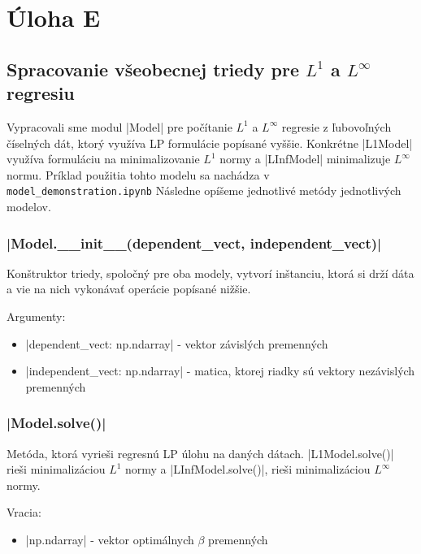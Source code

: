 \documentclass[report.tex]{subfiles}
\begin{document}
\section{Úloha E}\label{sec:E}

\subsection{Spracovanie všeobecnej triedy pre $L^1$ a $L^{\infty}$ regresiu}

Vypracovali sme modul \pyth|Model| pre počítanie $L^1$ a $L^{\infty}$ regresie z ľubovoľných číselných dát, ktorý využíva LP formulácie popísané vyššie. Konkrétne \pyth|L1Model| využíva formuláciu na minimalizovanie $L^1$ normy a \pyth|LInfModel| minimalizuje $L^{\infty}$ normu. Príklad použitia tohto modelu sa nachádza v \verb|model_demonstration.ipynb| Následne opíšeme jednotlivé metódy jednotlivých modelov.

\subsubsection*{\pyth|Model.__init__(dependent_vect, independent_vect)|}

Konštruktor triedy, spoločný pre oba modely, vytvorí inštanciu, ktorá si drží dáta a vie na nich vykonávať operácie popísané nižšie. 

Argumenty:

\begin{itemize}
	\item \pyth|dependent_vect: np.ndarray| - vektor závislých premenných
	\item \pyth|independent_vect: np.ndarray| - matica, ktorej riadky sú vektory nezávislých premenných
\end{itemize}

\subsubsection*{\pyth|Model.solve()|}

Metóda, ktorá vyrieši regresnú LP úlohu na daných dátach. \pyth|L1Model.solve()| rieši minimalizáciou $L^1$ normy a \pyth|LInfModel.solve()|, rieši minimalizáciou $L^{\infty}$ normy. 

Vracia:

\begin{itemize}
	\item \pyth|np.ndarray| - vektor optimálnych $\beta$ premenných
\end{itemize}
\end{document}
